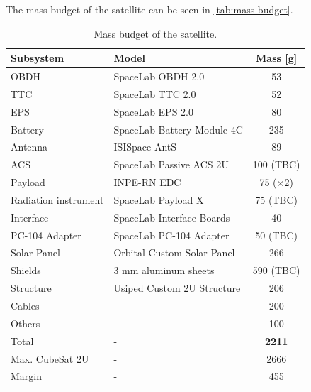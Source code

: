 The mass budget of the satellite can be seen in \autoref{tab:mass-budget}.

\begin{table}[!h]
    \centering
    \begin{tabular}{llc}
        \toprule[1.5pt]
        \textbf{Subsystem} & \textbf{Model} & \textbf{Mass [g]} \\
        \midrule
        OBDH                        & SpaceLab OBDH 2.0             & 53 \\
        TTC                         & SpaceLab TTC 2.0              & 52 \\
        EPS                         & SpaceLab EPS 2.0              & 80 \\
        Battery                     & SpaceLab Battery Module 4C    & 235 \\
        Antenna                     & ISISpace AntS                 & 89 \\
        ACS                         & SpaceLab Passive ACS 2U       & 100 (TBC) \\
        Payload                     & INPE-RN EDC                   & 75 ($\times$2) \\
        Radiation instrument            & SpaceLab Payload X            & 75 (TBC) \\
        Interface                   & SpaceLab Interface Boards     & 40 \\
        PC-104 Adapter              & SpaceLab PC-104 Adapter       & 50 (TBC) \\
        Solar Panel                 & Orbital Custom Solar Panel    & 266 \\
        Shields                     & 3 mm aluminum sheets          & 590 (TBC) \\
        Structure                   & Usiped Custom 2U Structure    & 206 \\
        Cables                      & -                             & 200 \\
        Others                      & -                             & 100 \\
        \midrule
        Total                       & -                             & \textbf{2211} \\
        Max. CubeSat 2U             & -                             & 2666 \\
        Margin                      & -                             & 455 \\
        \bottomrule[1.5pt]
    \end{tabular}
    \caption{Mass budget of the satellite.}
    \label{tab:mass-budget}
\end{table}

